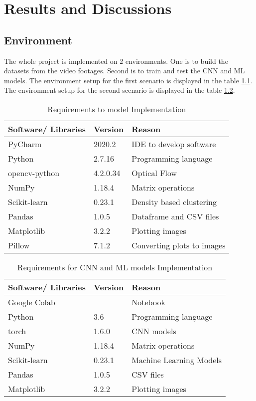\chapter{Results and Discussions}

\section{Environment}
The whole project is implemented on 2 environments. One is to build the datasets from the video footages. Second is to train and test the CNN and ML models. 
The environment setup for the first scenario is displayed in the table \ref{tab:scenario1}. The environment setup for the second scenario is displayed in the table  \ref{tab:scenario2}.  
\begin{table}[h!]
\centering
 \begin{tabular}{| p{3cm} p{3cm} p{6cm}|} 
 \hline
 \textbf{Software/ Libraries} & \textbf{Version}  & \textbf{Reason} \\
 \hline\hline
 PyCharm & 2020.2 & IDE to develop software \\
 \hline
 Python & 2.7.16 & Programming language \\
 \hline
 opencv-python & 4.2.0.34 & Optical Flow \\
 \hline
 NumPy & 1.18.4 & Matrix operations \\
 \hline
 Scikit-learn & 0.23.1 & Density based clustering \\
 \hline
 Pandas & 1.0.5 & Dataframe and CSV files \\
 \hline
 Matplotlib & 3.2.2 & Plotting images  \\
 \hline
 Pillow & 7.1.2 & Converting plots to images \\
 \hline
\end{tabular}
\caption{Requirements to model Implementation}
\label{tab:scenario1}
\end{table}

\begin{table}[h!]
\centering
 \begin{tabular}{| p{3cm} p{3cm} p{6cm}|} 
 \hline
 \textbf{Software/ Libraries} & \textbf{Version}  & \textbf{Reason} \\
 \hline\hline
 Google Colab &  & Notebook \\
 \hline
 Python & 3.6 & Programming language \\
 \hline
 torch & 1.6.0 & CNN models \\
 \hline
 NumPy & 1.18.4 & Matrix operations \\
 \hline
 Scikit-learn & 0.23.1 & Machine Learning Models\\
 \hline
 Pandas & 1.0.5 & CSV files \\
 \hline
 Matplotlib & 3.2.2 & Plotting images  \\
 \hline
\end{tabular}
\caption{Requirements for CNN and ML models Implementation}
\label{tab:scenario2}
\end{table}

